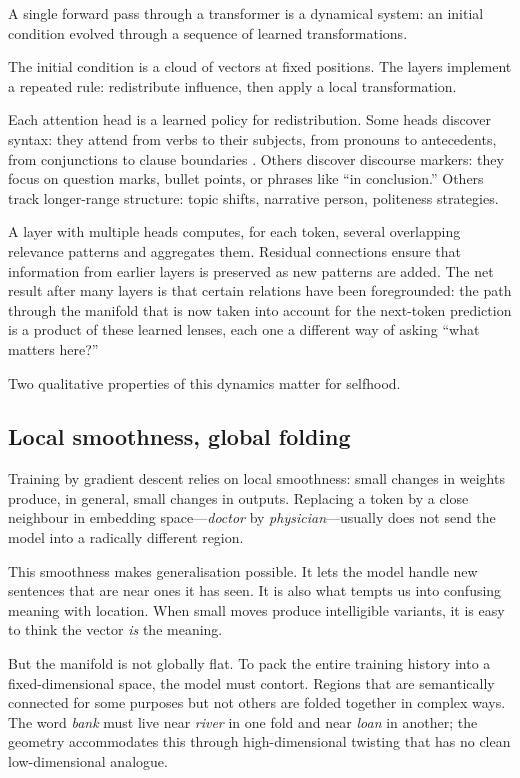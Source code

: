 \documentclass[12pt,a4paper]{article}
\begin{document}
A single forward pass through a transformer is a dynamical system: an initial condition evolved through a sequence of learned transformations.

The initial condition is a cloud of vectors at fixed positions. The layers implement a repeated rule: redistribute influence, then apply a local transformation.

Each attention head is a learned policy for redistribution. Some heads discover syntax: they attend from verbs to their subjects, from pronouns to antecedents, from conjunctions to clause boundaries \cite{voita2019,clark2019}. Others discover discourse markers: they focus on question marks, bullet points, or phrases like ``in conclusion.'' Others track longer-range structure: topic shifts, narrative person, politeness strategies.

A layer with multiple heads computes, for each token, several overlapping relevance patterns and aggregates them. Residual connections ensure that information from earlier layers is preserved as new patterns are added. The net result after many layers is that certain relations have been foregrounded: the path through the manifold that is now taken into account for the next-token prediction is a product of these learned lenses, each one a different way of asking ``what matters here?''

Two qualitative properties of this dynamics matter for selfhood.

\subsection*{Local smoothness, global folding}

Training by gradient descent relies on local smoothness: small changes in weights produce, in general, small changes in outputs. Replacing a token by a close neighbour in embedding space---\emph{doctor} by \emph{physician}---usually does not send the model into a radically different region.

This smoothness makes generalisation possible. It lets the model handle new sentences that are near ones it has seen. It is also what tempts us into confusing meaning with location. When small moves produce intelligible variants, it is easy to think the vector \emph{is} the meaning.

But the manifold is not globally flat. To pack the entire training history into a fixed-dimensional space, the model must contort. Regions that are semantically connected for some purposes but not others are folded together in complex ways. The word \emph{bank} must live near \emph{river} in one fold and near \emph{loan} in another; the geometry accommodates this through high-dimensional twisting that has no clean low-dimensional analogue.
\end{document}
